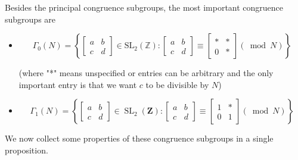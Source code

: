 \begin{remark}
    

Besides the principal congruence subgroups, the most important congruence subgroups are

\begin{itemize}
    \item $$
\Gamma_{0}(N)=\left\{\left[\begin{array}{ll}
a & b \\
c & d
\end{array}\right] \in \mathrm{SL}_{2}(\mathbb{Z}):\left[\begin{array}{ll}
a & b \\
c & d
\end{array}\right] \equiv\left[\begin{array}{ll}
* & *\\
0 & *
\end{array}\right](\bmod N)\right\}
$$

(where "*" means unspecified or entries can be arbitrary and the only important entry is that we want $c$ to be divisible by $N$)

\item $$
\Gamma_{1}(N)=\left\{\left[\begin{array}{ll}
a & b \\
c & d
\end{array}\right] \in \operatorname{SL}_{2}(\mathbf{Z}):\left[\begin{array}{ll}
a & b \\
c & d
\end{array}\right] \equiv\left[\begin{array}{ll}
1 & * \\
0 & 1
\end{array}\right](\bmod N)\right\}
$$
 
\end{itemize}
\end{remark}
We now collect some properties of these congruence subgroups in a single proposition.

